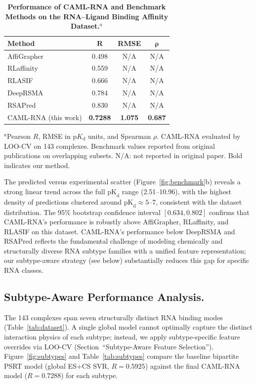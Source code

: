 \documentclass[10pt,twocolumn]{article}
\newcommand{\kD}{\text{pK}_{\mathrm{d}}}
\begin{document}
\begin{table}[htbp]
\centering
\caption{\textbf{Performance of CAML-RNA and Benchmark Methods on the
RNA--Ligand Binding Affinity Dataset.}$^{a}$}
\label{tab:benchmark}
\begin{tabular}{lccc}
\toprule
\textbf{Method} & $\bm{R}$ & \textbf{RMSE} & $\bm{\rho}$ \\
\midrule
AffiGrapher\cite{AffiGrapher2023}   & 0.498 & N/A & N/A \\
RLaffinity\cite{RLaffinity2022}     & 0.559 & N/A & N/A \\
RLASIF\cite{RLASIF2023}            & 0.666 & N/A & N/A \\
DeepRSMA\cite{DeepRSMA2023}         & 0.784 & N/A & N/A \\
RSAPred\cite{RSAPred2022}           & 0.830 & N/A & N/A \\
\midrule
CAML-RNA (this work)                & \textbf{0.7288} & \textbf{1.075} & \textbf{0.687} \\
\bottomrule
\end{tabular}
\small{$^{a}$Pearson $R$, RMSE in p$K_\mathrm{d}$ units, and Spearman $\rho$.
CAML-RNA evaluated by LOO-CV on 143 complexes. Benchmark values reported
from original publications on overlapping subsets. N/A: not reported in original paper.
Bold indicates our method.}
\end{table}

The predicted versus experimental scatter (Figure~\ref{fig:benchmark}b)
reveals a strong linear trend across the full $\kD$ range (2.51--10.96),
with the highest density of predictions clustered around $\kD \approx 5$--7,
consistent with the dataset distribution.
The 95\% bootstrap confidence interval $[0.634, 0.802]$ confirms that
CAML-RNA's performance is robustly above AffiGrapher, RLaffinity, and RLASIF
on this dataset.
CAML-RNA's performance below DeepRSMA and RSAPred reflects the fundamental
challenge of modeling chemically and structurally diverse RNA subtype families
with a unified feature representation; our subtype-aware strategy (see below)
substantially reduces this gap for specific RNA classes.


\subsection{Subtype-Aware Performance Analysis.}

The 143 complexes span seven structurally distinct RNA binding modes
(Table~\ref{tab:dataset}).
A single global model cannot optimally capture the distinct interaction
physics of each subtype;
instead, we apply subtype-specific feature overrides via LOO-CV
(Section~``Subtype-Aware Feature Selection'').
Figure~\ref{fig:subtypes} and Table~\ref{tab:subtypes} compare
the baseline bipartite PSRT model (global ES+CS SVR, $R = 0.5925$)
against the final CAML-RNA model ($R = 0.7288$) for each subtype.
\end{document}
